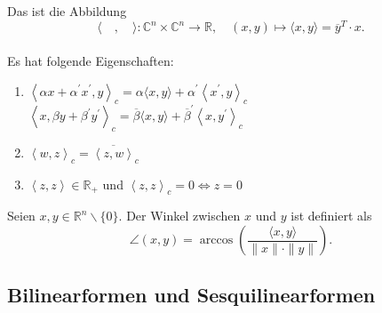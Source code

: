 \documentclass[9pt, a4paper, twocolumn, landscape]{article}
\begin{document}
\begin{definition}
Das  ist die Abbildung $$\langle\quad, \quad\rangle: \mathbb{C}^{n} \times \mathbb{C}^{n} \rightarrow \mathbb{R}, \quad(x, y) \mapsto\langle x, y\rangle  = \overline{y}^T \cdot x.$$
\\Es hat folgende Eigenschaften:
\begin{enumerate}
\item {} $\left\langle \alpha x+ \alpha^{\prime} x^{\prime}, y\right\rangle_c=\alpha \langle x, y\rangle+ \alpha^{\prime}\left\langle x^{\prime}, y\right\rangle_c $
\\$\left\langle x, \beta y+ \beta^{\prime} y^{\prime}\right\rangle_c=\overline{\beta} \langle x, y\rangle+ \overline{\beta}^{\prime}\left\langle x, y^{\prime}\right\rangle_c $
\item {} $\left\langle w, z \right\rangle_c = \overline{\left\langle z, w \right\rangle}_c$
\item {} $\left\langle z, z \right\rangle \in \mathbb{R}_+$ und $\left\langle z, z\right\rangle_c = 0 \Leftrightarrow z = 0$
\end{enumerate}
\end{definition}





\begin{definition}
Seien $x, y \in \mathbb{R}^n\backslash \{0\} $.
Der Winkel zwischen $x$ und $y$ ist definiert als
\begin{equation*}
\angle(x, y) = \arccos\left(\frac{\langle x, y\rangle}{\|x\| \cdot\|y\|}\right).
\end{equation*}
\end{definition}

\subsection{Bilinearformen und Sesquilinearformen}
\end{document}
